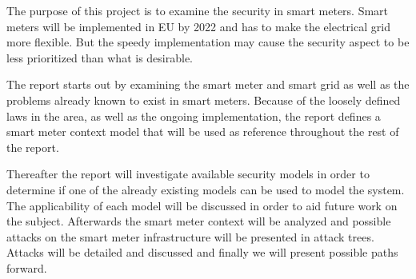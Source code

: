 The purpose of this project is to examine the security in smart meters.
Smart meters will be implemented in EU by 2022 and has to make the electrical grid more flexible.
But the speedy implementation may cause the security aspect to be less prioritized than what is desirable.

The report starts out by examining the smart meter and smart grid as well as the problems already known to exist in smart meters.
Because of the loosely defined laws in the area, as well as the ongoing implementation, the report defines a smart meter context model that will be used as reference throughout the rest of the report.

Thereafter the report will investigate available security models in order to determine if one of the already existing models can be used to model the system.
The applicability of each model will be discussed in order to aid future work on the subject.
Afterwards the smart meter context will be analyzed and possible attacks on the smart meter infrastructure will be presented in attack trees.
Attacks will be detailed and discussed and finally we will present possible paths forward.

